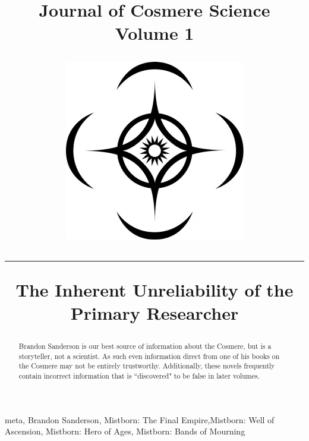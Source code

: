 \documentclass[conference]{IEEEtran}
\newcommand{\n}{\hfill\break}
\begin{document}
\makeatletter
\newlength{\logoheight}
\setlength{\logoheight}{50pt} %

\title{\parbox[c]{.75\linewidth}{{\selectfont\Huge{\textbf{Journal of Cosmere Science}}\\\huge{Volume 1}}}%
    \hfill%
    \raisebox{\dimexpr-.5\logoheight+.5ex\relax}%
    {\includegraphics[height=\logoheight]{images/cosmere_symbol.png}}\par%
    \vspace{15pt}%
    
    \hrule
    \n
    \textbf{The Inherent Unreliability of the Primary Researcher}
    }

\author{
}

\maketitle

\begin{abstract}
Brandon Sanderson is our best source of information about the Cosmere, but is a storyteller, not a scientist.  As such even information direct from one of his books on the Cosmere may not be entirely trustworthy.  Additionally, these novels frequently contain incorrect information that is ``discovered" to be false in later volumes.
\end{abstract}

\begin{IEEEkeywords}
meta, Brandon Sanderson, Mistborn: The Final Empire,Mistborn: Well of Ascension, Mistborn: Hero of Ages, Mistborn: Bands of Mourning
\end{IEEEkeywords}
\end{document}
